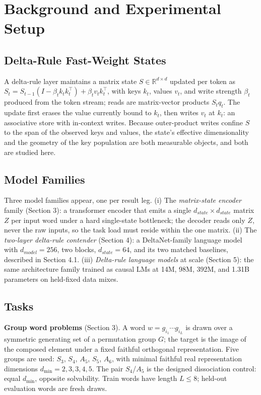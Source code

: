 \section{Background and Experimental Setup}

\subsection{Delta-Rule Fast-Weight States}

A delta-rule layer maintains a matrix state $S \in \mathbb{R}^{d \times d}$
updated per token as
$S_t = S_{t-1}(I - \beta_t k_t k_t^{\top}) + \beta_t v_t k_t^{\top}$,
with keys $k_t$, values $v_t$, and write strength $\beta_t$ produced from
the token stream; reads are matrix-vector products $S_t q_t$. The update
first erases the value currently bound to $k_t$, then writes $v_t$ at
$k_t$: an associative store with in-context writes. Because outer-product
writes confine $S$ to the span of the observed keys and values, the state's
effective dimensionality and the geometry of the key population are both
measurable objects, and both are studied here.

\subsection{Model Families}

Three model families appear, one per result leg. (i) The \emph{matrix-state
encoder} family (Section 3): a transformer encoder that emits a single
$d_{state} \times d_{state}$ matrix $Z$ per input word under a hard
single-state bottleneck; the decoder reads only $Z$, never the raw
inputs, so the task load must reside within the one matrix. (ii) The
\emph{two-layer delta-rule contender} (Section 4): a DeltaNet-family language
model with $d_{model}=256$, two blocks, $d_{state}=64$, and its two matched baselines, described in
Section 4.1. (iii) \emph{Delta-rule language models} at scale (Section 5):
the same architecture family trained as causal LMs at 14M, 98M, 392M,
and 1.31B parameters on held-fixed data mixes.

\subsection{Tasks}

\textbf{Group word problems} (Section 3). A word $w = g_{i_1} \cdots g_{i_L}$
is drawn over a symmetric generating set of a permutation group $G$; the
target is the image of the composed element under a fixed faithful
orthogonal representation. Five groups are used: $S_3$, $S_4$, $A_5$,
$S_5$, $A_6$, with minimal faithful real representation dimensions
$d_{\min} = 2, 3, 3, 4, 5$. The pair
$S_4$/$A_5$ is the designed dissociation control: equal $d_{\min}$,
opposite solvability. Train words have length $L \le 8$; held-out
evaluation words are fresh draws.

